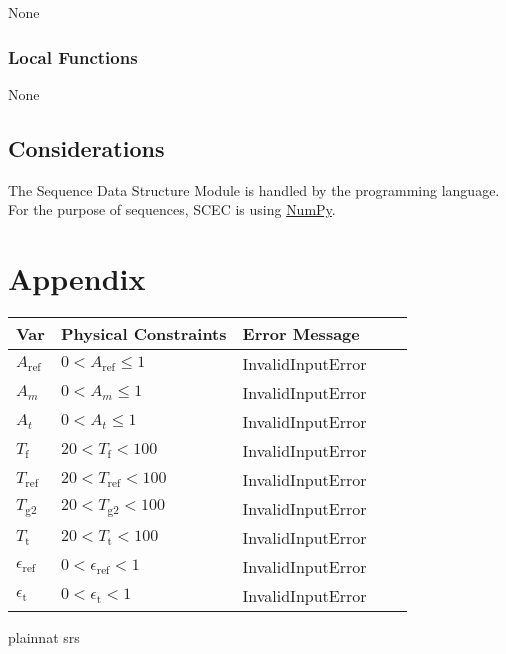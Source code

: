 \documentclass[12pt, titlepage]{article}
\begin{document}
None

\subsubsection{Local Functions}

None

\subsection{Considerations}

The Sequence Data Structure Module is handled by the programming language. For the purpose of sequences, SCEC is using \href{https://numpy.org}{NumPy}.   

\section{Appendix} \label{Appendix}

\begin{table}[!h]
  \caption{Possible errors for input} \label{verify_input}
  \renewcommand{\arraystretch}{1.2}
\noindent \begin{longtable*}{l l l l c} 
  \toprule
  \textbf{Var} & \textbf{Physical Constraints} & \textbf{Error Message} \\
  \midrule 

 $A_\text{ref}$ & $0 < A_\text{ref} \le 1$ & InvalidInputError \\
  $A_m$ & $0 < A_m \le 1 $ & InvalidInputError \\
  $A_t$ & $0 < A_t \le 1 $ & InvalidInputError \\
  $T_\text{f}$ & $20 < T_\text{f} < 100$ & InvalidInputError\\
  $T_\text{ref}$ & $20 < T_\text{ref} < 100$ &InvalidInputError \\
  $T_\text{g2}$ & $20 < T_\text{g2} < 100$ &InvalidInputError \\
  $T_\text{t}$ & $20 < T_\text{t} < 100$ & InvalidInputError\\
  $\epsilon_\text{ref}$ & $0 < \epsilon_\text{ref} < 1$ & InvalidInputError\\
   $\epsilon_\text{t}$ & $0 < \epsilon_\text{t} < 1$ & InvalidInputError \\
  
  \bottomrule
\end{longtable*}
\end{table}

 {plainnat}
 {srs}
\end{document}
